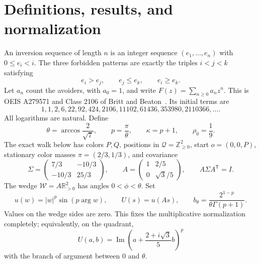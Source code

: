 \documentclass[11pt,letterpaper]{article}
\theoremstyle{remark}\newtheorem{remark}[theorem]{Remark}
\newcommand{\ZZ}{\mathbb Z}
\newcommand{\RR}{\mathbb R}
\newcommand{\Qd}{\mathcal Q}
\newcommand{\1}{\mathbf1}
\newcommand{\Wedge}{\mathcal W}
\DeclareMathOperator{\Impart}{Im}
\begin{document}
\section{Definitions, results, and normalization}
An inversion sequence of length $n$ is an integer sequence
$(e_1,\ldots,e_n)$ with $0\le e_i<i$. The three forbidden patterns
are exactly the triples $i<j<k$ satisfying
\begin{equation}\label{icw:eq:avoid}
 e_i>e_j,\qquad e_j\le e_k,\qquad e_i\ge e_k.
\end{equation}
Let $a_n$ count the avoiders, with $a_0=1$, and write
$F(z)=\sum_{n\ge0}a_nz^n$. This is OEIS A279571 and Class 2106
of Britt and Beaton~\cite{oeis,bb}. Its initial terms are
\[
1,1,2,6,22,92,424,2106,11102,61436,353980,2110366,\ldots.
\]
All logarithms are natural. Define
\begin{equation}\label{icw:eq:constants}
 \theta=\arccos\frac2{\sqrt7},\qquad p=\frac\pi\theta,
 \qquad\kappa=p+1,\qquad\rho_0=\frac19.
\end{equation}
The exact walk below has colors $P,Q$, positions in
$\Qd=\ZZ_{\ge0}^2$, start $o=(0,0,P)$, stationary color masses
$\pi=(2/3,1/3)$, and covariance
\begin{equation}\label{icw:eq:Sigma-main}
 \Sigma=\begin{pmatrix}7/3&-10/3\\-10/3&25/3\end{pmatrix},\qquad
 A=\begin{pmatrix}1&2/5\\0&\sqrt3/5\end{pmatrix},\qquad
 A\Sigma A^{\mathsf T}=I.
\end{equation}
The wedge $\Wedge=A\RR_{>0}^2$ has angles $0<\phi<\theta$. Set
\begin{equation}\label{icw:eq:U}
 u(w)=|w|^p\sin(p\arg w),\qquad U(s)=u(As),\qquad
 b_\theta=\frac{2^{1-p}}{\theta\Gamma(p+1)}.
\end{equation}
Values on the wedge sides are zero. This fixes the multiplicative
normalization completely; equivalently, on the quadrant,
\[
 U(a,b)=\Impart\left(a+\frac{2+i\sqrt3}{5}b\right)^p
\]
with the branch of argument between $0$ and $\theta$.
\end{document}
